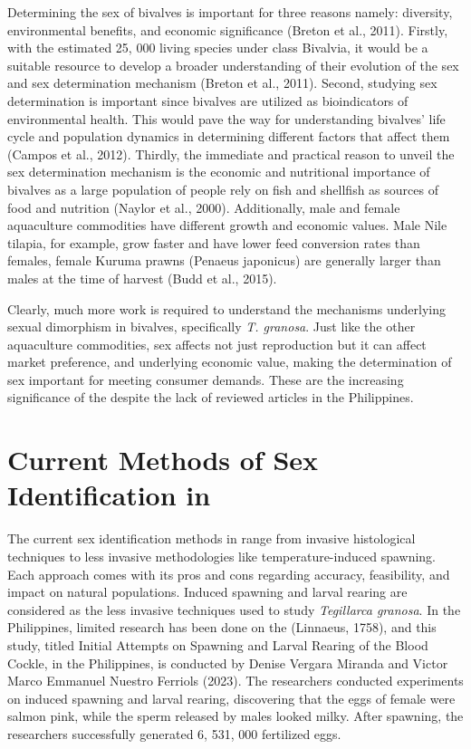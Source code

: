 Determining the sex of bivalves is important for three reasons namely: diversity, environmental benefits, and economic significance (Breton et al., 2011). Firstly, with the estimated 25, 000 living species under class Bivalvia, it would be a suitable resource to develop a broader understanding of their evolution of the sex and sex determination mechanism  (Breton et al., 2011). Second, studying sex determination is important since bivalves are utilized as bioindicators of environmental health. This would pave the way for understanding bivalves' life cycle and population dynamics in determining different factors that affect them (Campos et al., 2012). Thirdly, the immediate and practical reason to unveil the sex determination mechanism is the economic and nutritional importance of bivalves as a large population of people rely on fish and shellfish as sources of food and nutrition (Naylor et al., 2000). Additionally, male and female aquaculture commodities have different growth and economic values. Male Nile tilapia, for example, grow faster and have lower feed conversion rates than females, female Kuruma prawns (Penaeus japonicus) are generally larger than males at the time of harvest (Budd et al., 2015). 

Clearly, much more work is required to understand the mechanisms underlying sexual dimorphism in bivalves, specifically \textit{T. granosa}. Just like the other aquaculture commodities, sex affects not just reproduction but it can affect market preference, and underlying economic value, making the determination of sex important for meeting consumer demands. These are the increasing significance of the \Tgranosa despite the lack of reviewed articles in the Philippines.

\section{Current Methods of Sex Identification in \Tegillarcagranosa}

The current sex identification methods in \Tegillarcagranosa range from invasive histological techniques to less invasive methodologies like temperature-induced spawning. Each approach comes with its pros and cons regarding accuracy, feasibility, and impact on natural populations.
Induced spawning and larval rearing are considered as the less invasive techniques used to study \textit{Tegillarca granosa}. In the Philippines, limited research has been done on the \Tegillarcagranosa (Linnaeus, 1758), and this study, titled Initial Attempts on Spawning and Larval Rearing of the Blood Cockle, \Tegillarcagranosa in the Philippines, is conducted by Denise Vergara Miranda and Victor Marco Emmanuel Nuestro Ferriols (2023). The researchers conducted experiments on induced spawning and larval rearing, discovering that the eggs of female \Tgranosa were salmon pink, while the sperm released by males looked milky. After spawning, the researchers successfully generated 6, 531, 000 fertilized eggs.

